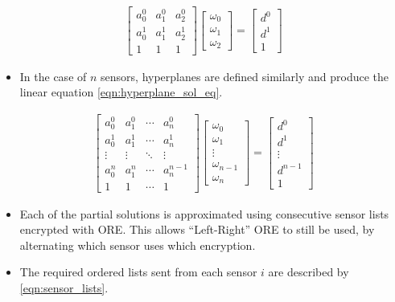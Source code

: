 \documentclass[letterpaper, 10 pt, conference]{ieeeconf}  %
\begin{document}
\begin{gather}
   \begin{bmatrix}
      a_0^0 & a_1^0 & a_2^0 \\
      a_0^1 & a_1^1 & a_2^1 \\
      1 & 1 & 1
   \end{bmatrix}
   \begin{bmatrix}
      \omega_0 \\
      \omega_1 \\
      \omega_2
   \end{bmatrix}
   =
   \begin{bmatrix}
      d^0 \\
      d^1 \\
      1
   \end{bmatrix} \label{eqn:3sen_plane_sol_eq}
\end{gather}
\begin{itemize}
   \item In the case of $n$ sensors, hyperplanes are defined similarly and produce the linear equation \eqref{eqn:hyperplane_sol_eq}.
\end{itemize}
\begin{gather}
   \begin{bmatrix}
      a_0^0 & a_1^0 & \cdots & a_n^0 \\
      a_0^1 & a_1^1 & \cdots & a_n^1 \\
      \vdots & \vdots & \ddots & \vdots \\
      a_0^n & a_1^n & \cdots & a_n^{n-1} \\
      1 & 1 & \cdots & 1
   \end{bmatrix}
   \begin{bmatrix}
      \omega_0 \\
      \omega_1 \\
      \vdots \\
      \omega_{n-1} \\
      \omega_n
   \end{bmatrix}
   =
   \begin{bmatrix}
      d^0 \\
      d^1 \\
      \vdots \\
      d^{n-1} \\
      1
   \end{bmatrix} \label{eqn:hyperplane_sol_eq}
\end{gather}
\begin{itemize}
   \item Each of the partial solutions is approximated using consecutive sensor lists encrypted with ORE. This allows ``Left-Right'' ORE to still be used, by alternating which sensor uses which encryption.
   \item The required ordered lists sent from each sensor $i$ are described by \eqref{eqn:sensor_lists}.
\end{itemize}
\end{document}
